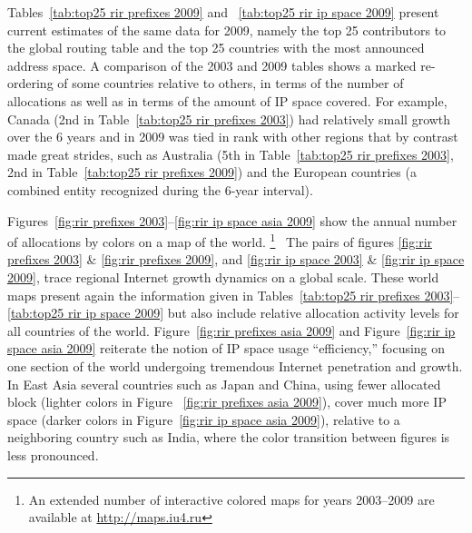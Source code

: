 Tables~\ref{tab:top25 rir prefixes 2009} and ~\ref{tab:top25 rir ip space 2009}
present current estimates of the same data for 2009, namely the top 25
contributors to the global routing table and the top 25 countries with the most
announced address space. A comparison of the 2003 and 2009 tables shows a
marked re-ordering of some countries relative to others, in terms of the number
of allocations as well as in terms of the amount of IP space covered. For
example, Canada (2nd in Table~\ref{tab:top25 rir prefixes 2003}) had relatively
small growth over the 6 years and in 2009 was tied in rank with other regions
that by contrast made great strides, such as Australia (5th in
Table~\ref{tab:top25 rir prefixes 2003}, 2nd in Table~\ref{tab:top25 rir
prefixes 2009}) and the European countries (a combined entity recognized during
the 6-year interval).

Figures~\ref{fig:rir prefixes 2003}--\ref{fig:rir ip space asia 2009} show the
annual number of allocations by colors on a map of the world.%
%
\footnote{%
An extended number of interactive colored maps for years 2003--2009 are
available at \url{http://maps.iu4.ru}}%
%
~The pairs of figures \ref{fig:rir prefixes 2003} \& \ref{fig:rir prefixes
2009}, and \ref{fig:rir ip space 2003} \& \ref{fig:rir ip space 2009}, trace
regional Internet growth dynamics on a global scale. These world maps present
again the information given in Tables~\ref{tab:top25 rir prefixes
2003}--\ref{tab:top25 rir ip space 2009} but also include relative allocation
activity levels for all countries of the world. Figure~\ref{fig:rir prefixes
asia 2009} and Figure~\ref{fig:rir ip space asia 2009} reiterate the notion of
IP space usage ``efficiency,'' focusing on one section of the world undergoing
tremendous Internet penetration and growth. In East Asia several countries such
as Japan and China, using fewer allocated block (lighter colors in Figure
~\ref{fig:rir prefixes asia 2009}), cover much more IP space (darker colors in
Figure~\ref{fig:rir ip space asia 2009}), relative to a neighboring country
such as India, where the color transition between figures is less pronounced.
